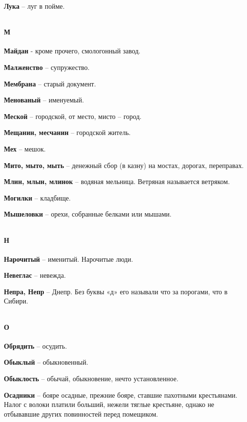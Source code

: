 \begin{multicols}{2}
\textbf{Лука} – луг в пойме.

\mbox{ }\\
\textbf{М\\}
\mbox{ }\\

\textbf{Майдан} - кроме прочего, смологонный завод.

\textbf{Малженство} – супружество.


\textbf{Мембрана} – старый документ.

\textbf{Менованый} – именуемый.

\textbf{Меской} – городской, от место, мисто – город.

\textbf{Мещанин, месчанин} – городской житель.

\textbf{Мех} – мешок.

\textbf{Мито, мыто, мыть} – денежный сбор (в казну) на мостах, дорогах, переправах.

\textbf{Млин, млын, млинок} – водяная мельница. Ветряная называется ветряком.

\textbf{Могилки} – кладбище.

\textbf{Мышеловки} – орехи, собранные белками или мышами.

\mbox{ }\\
\textbf{Н\\}
\mbox{ }\\

\textbf{Нарочитый} – именитый. Нарочитые люди.

\textbf{Невеглас} – невежда.


\textbf{Непра, Непр} – Днепр. Без буквы «д» его называли что за порогами, что в Сибири.

\mbox{ }\\
\textbf{О\\}
\mbox{ }\\

\textbf{Обрядить} – осудить.

\textbf{Обыклый} – обыкновенный.

\textbf{Обыклость} – обычай, обыкновение, нечто установленное.

\textbf{Осадники} – бояре осадные, прежние бояре, ставшие пахотными крестьянами. Налог с волоки платили больший, нежели тяглые крестьяне, однако не отбывавшие других повинностей перед помещиком.


\end{multicols}
